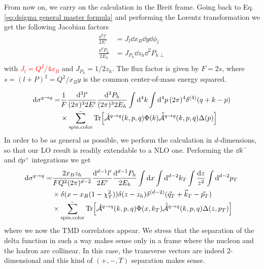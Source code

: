 From now on, we carry on the calculation in the Breit frame. Going back to Eq. \eqref{eq:dsigma general master formula} and performing the Lorentz transformation we get the following Jacobian factors
\begin{equation}
    \begin{aligned}
        \frac{\dd^{3}l'}{2E'}&=J_l\dd x_B \dd y \dd \phi_l\\
        \frac{\dd^{3}P_h}{2E_h}&=J_{P_h}\dd z_h \dd^{2}P_{h\perp}\\
    \end{aligned}
\end{equation}  
with \textcolor{red}{$J_l=Q^2/4x_B$} and $J_{P_h}=1/2z_h$. The flux factor is given by $F=2s$, where $s=(l+P)^2=Q^2/x_B y$ is the common center-of-mass energy squared.







\newpage
\begin{equation}
\begin{aligned}
        \dd \sigma^{q \to q} = &\frac{1}{F}\frac{\dd ^3l'}{(2\pi)^3 2E'}\frac{\dd^3P_h}{(2\pi)^3 2E_h}\int \dd^4k\int \dd^4p \,(2\pi)^4 \delta^{(4)}(q+k-p)\\&\times\bar{\sum_{\text{spin,color}}}\Tr[\hat{\mathcal{A}}^{q\to q}(k,p,q) \Phi(k)\hat{\bar{\mathcal{A}}}^{q\to q}(k,p,q)\Delta(p)]
\end{aligned}
\end{equation}
In order to be as general as possible, we perform the calculation in $d$-dimensions, so that our LO result is readily extendable to a NLO one. Performing the $\dd k^-$ and $\dd p^+$ integrations we get
\begin{equation}\label{eq:sigmaqqv1}
    \begin{aligned}
        \dd \sigma^{q \to q} = &\frac{2x_B z_h}{FQ^2(2\pi)^{d-2}}\frac{\dd ^{d-1}l'}{2E'}\frac{\dd^{d-1}P_h}{ 2E_h}\int \dd x \int \dd^{d-2}k_T\int \frac{\dd z}{z^2}\int \dd^{d-2}p_T \,\\
        &\times\delta(x-x_B(1-\chi_T^2))\delta(z-z_h)\delta^{(d-2)}(\vec q_T+\vec k_T-\vec p_T)\\&\times\bar{\sum_{\text{spin,color}}}\Tr[\hat{\mathcal{A}}^{q\to q}(k,p,q) \Phi(x,k_T)\hat{\bar{\mathcal{A}}}^{q\to q}(k,p,q)\Delta(z,p_T)]
    \end{aligned}
\end{equation}
where we now the TMD correlators appear. We stress that the separation of the delta function in such a way makes sense only in a frame where the nucleon and the hadron are collinear. In this case, the transverse vectors are indeed 2-dimensional and this kind of $(+,-,T)$ separation makes sense. \\

